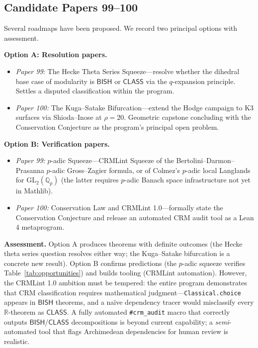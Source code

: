 \documentclass[11pt,a4paper]{article}
\theoremstyle{plain}
\theoremstyle{definition}
\newcommand{\BISH}{\textsf{BISH}}
\newcommand{\CLASS}{\textsf{CLASS}}
\newcommand{\Q}{\mathbb{Q}}
\newcommand{\R}{\mathbb{R}}
\newcommand{\GL}{\mathrm{GL}}
\begin{document}
\subsection{Candidate Papers 99--100}

Several roadmaps have been proposed. We record two principal options with assessment.

\medskip
\noindent\textbf{Option A: Resolution papers.}
\begin{itemize}
\item \emph{Paper 99:} The Hecke Theta Series Squeeze---resolve whether the dihedral base case of modularity is $\BISH$ or $\CLASS$ via the $q$-expansion principle. Settles a disputed classification within the program.
\item \emph{Paper 100:} The Kuga--Satake Bifurcation---extend the Hodge campaign to K3 surfaces via Shioda--Inose at $\rho = 20$. Geometric capstone concluding with the Conservation Conjecture as the program's principal open problem.
\end{itemize}

\noindent\textbf{Option B: Verification papers.}
\begin{itemize}
\item \emph{Paper 99:} $p$-adic Squeeze---CRMLint Squeeze of the Bertolini--Darmon--Prasanna $p$-adic Gross--Zagier formula, or of Colmez's $p$-adic local Langlands for $\GL_2(\Q_p)$ (the latter requires $p$-adic Banach space infrastructure not yet in Mathlib).
\item \emph{Paper 100:} Conservation Law and CRMLint 1.0---formally state the Conservation Conjecture and release an automated CRM audit tool as a Lean 4 metaprogram.
\end{itemize}

\noindent\textbf{Assessment.} Option A produces theorems with definite outcomes (the Hecke theta series question resolves either way; the Kuga--Satake bifurcation is a concrete new result). Option B confirms predictions (the $p$-adic squeeze verifies Table~\ref{tab:opportunities}) and builds tooling (CRMLint automation). However, the CRMLint 1.0 ambition must be tempered: the entire program demonstrates that CRM classification requires mathematical judgment---\texttt{Classical.choice} appears in $\BISH$ theorems, and a na\"ive dependency tracer would misclassify every $\R$-theorem as $\CLASS$. A fully automated \texttt{\#crm\_audit} macro that correctly outputs $\BISH$/$\CLASS$ decompositions is beyond current capability; a \emph{semi}-automated tool that flags Archimedean dependencies for human review is realistic.
\end{document}
